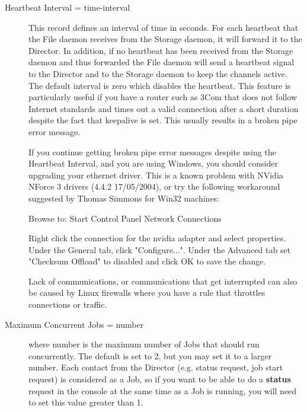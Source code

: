 \begin{description}
\item [Heartbeat Interval = \lt{}time-interval\gt{}]
   This record defines an interval of time in seconds.  For each heartbeat that the
   File daemon receives from the Storage daemon, it will forward it to the
   Director.  In addition, if no heartbeat has been received from the
   Storage daemon and thus forwarded the File daemon will send a heartbeat
   signal to the Director and to the Storage daemon to keep the channels
   active.  The default interval is zero which disables the heartbeat.
   This feature is particularly useful if you have a router such as 3Com
   that does not follow Internet standards and times out a valid    
   connection after a short duration despite the fact that keepalive is
   set. This usually results in a broken pipe error message.

   If you continue getting broken pipe error messages despite using the
   Heartbeat Interval, and you are using Windows, you should consider
   upgrading your ethernet driver.  This is a known problem with NVidia
   NForce 3 drivers (4.4.2 17/05/2004), or try the following workaround
   suggested by Thomas Simmons for Win32 machines:

   Browse to:
   Start \gt{} Control Panel \gt{} Network Connections

   Right click the connection for the nvidia adapter and select properties. 
   Under the General tab, click "Configure...". Under the Advanced tab set 
   "Checksum Offload" to disabled and click OK to save the change.  
   
   Lack of communications, or communications that get interrupted can
   also be caused by Linux firewalls where you have a rule that throttles
   connections or traffic.


\item [Maximum Concurrent Jobs = \lt{}number\gt{}]
   where \lt{}number\gt{} is the maximum number of Jobs that should run
   concurrently.  The default is set to 2, but you may set it to a larger
   number.  Each contact from the Director (e.g.  status request, job start
   request) is considered as a Job, so if you want to be able to do a {\bf
   status} request in the console at the same time as a Job is running, you
   will need to set this value greater than 1.


\end{description}
